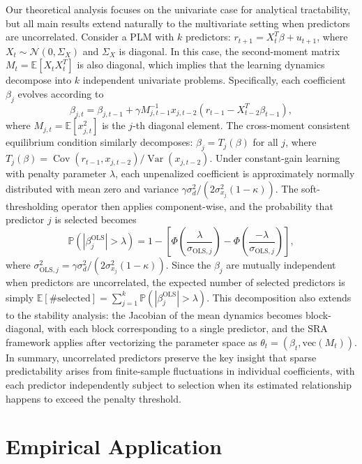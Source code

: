 \documentclass[11pt]{article}
\begin{document}
Our theoretical analysis focuses on the univariate case for analytical tractability, but all main results extend naturally to the multivariate setting when predictors are uncorrelated.
Consider a PLM with $k$ predictors: $r_{t+1} = X_t^T \beta + u_{t+1}$, where $X_t \sim \mathcal{N}(0, \Sigma_X)$ and $\Sigma_X$ is diagonal.
In this case, the second-moment matrix $M_t = \mathbb{E}[X_t X_t^T]$ is also diagonal, which implies that the learning dynamics decompose into $k$ independent univariate problems.
Specifically, each coefficient $\beta_j$ evolves according to
\begin{equation}
\beta_{j,t} = \beta_{j,t-1} + \gamma M^{-1}_{j,t-1} x_{j,t-2} \left(r_{t-1} - X_{t-2}^T \beta_{t-1}\right),
\end{equation}
where $M_{j,t} = \mathbb{E}[x_{j,t}^2]$ is the $j$-th diagonal element.
The cross-moment consistent equilibrium condition similarly decomposes: $\beta_j = T_j(\beta)$ for all $j$, where $T_j(\beta) = \operatorname{Cov}(r_{t-1}, x_{j,t-2})/\operatorname{Var}(x_{j,t-2})$.
Under constant-gain learning with penalty parameter $\lambda$, each unpenalized coefficient is approximately normally distributed with mean zero and variance $\gamma \sigma_d^2/(2\sigma^2_{x_j}(1-\kappa))$.
The soft-thresholding operator then applies component-wise, and the probability that predictor $j$ is selected becomes
\begin{equation}
\mathbb{P}(|\beta^{\text{OLS}}_j| > \lambda) = 1 - \left[\Phi\left(\frac{\lambda}{\sigma_{\text{OLS},j}}\right) - \Phi\left(\frac{-\lambda}{\sigma_{\text{OLS},j}}\right)\right],
\end{equation}
where $\sigma_{\text{OLS},j}^2 = \gamma \sigma_d^2/(2\sigma^2_{x_j}(1-\kappa))$.
Since the $\beta_j$ are mutually independent when predictors are uncorrelated, the expected number of selected predictors is simply $\mathbb{E}[\text{\# selected}] = \sum_{j=1}^k \mathbb{P}(|\beta^{\text{OLS}}_j| > \lambda)$.
This decomposition also extends to the stability analysis: the Jacobian of the mean dynamics becomes block-diagonal, with each block corresponding to a single predictor, and the SRA framework applies after vectorizing the parameter space as $\theta_t = (\beta_t, \text{vec}(M_t))$.
In summary, uncorrelated predictors preserve the key insight that sparse predictability arises from finite-sample fluctuations in individual coefficients, with each predictor independently subject to selection when its estimated relationship happens to exceed the penalty threshold.


\section{Empirical Application}\label{sec:empirical}
\end{document}
